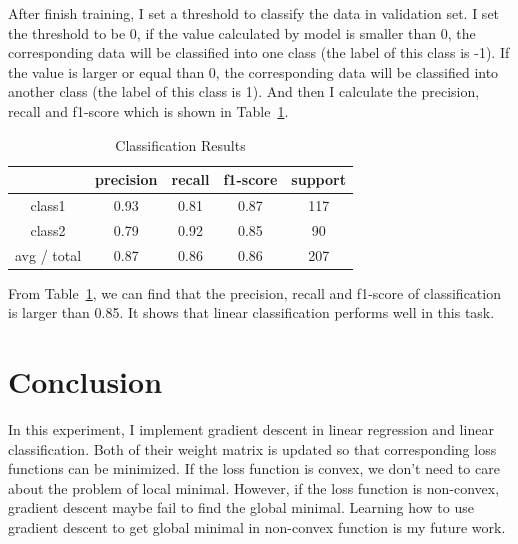 \documentclass[journal, a4paper]{IEEEtran}
\begin{document}
After finish training, I set a threshold to classify the data in validation set. I set the threshold to be 0, if the value calculated by model is smaller than 0, the corresponding data will be classified into one class (the label of this class is -1). If the value is larger or equal than 0, the corresponding data will be classified into another class (the label of this class is 1). And then I calculate the precision, recall and f1-score which is shown in Table~\ref{table_1}.

    \begin{table}[!hbt]
		\begin{center}
		\caption{Classification Results}
		\label{table_1}
		\begin{tabular}{|c|c|c|c|c|}
			\hline
			  & precision & recall & f1-score & support \\
			\hline
			class1 & 0.93 & 0.81 & 0.87  & 117 \\
			\hline
			class2 & 0.79 & 0.92 & 0.85  & 90 \\
			\hline
			avg / total & 0.87 & 0.86 & 0.86 & 207 \\
			\hline
		\end{tabular}
		\end{center}
	\end{table}

From Table~\ref{table_1}, we can find that the precision, recall and f1-score of classification is larger than 0.85. It shows that linear classification performs well in this task.

\section{Conclusion}
In this experiment, I implement gradient descent in linear regression and linear classification. Both of their weight matrix is updated so that corresponding loss functions can be minimized. If the loss function is convex, we don't need to care about the problem of local minimal. However, if the loss function is non-convex, gradient descent maybe fail to find the global minimal. Learning how to use gradient descent to get global minimal in non-convex function is my future work.

\end{document}
